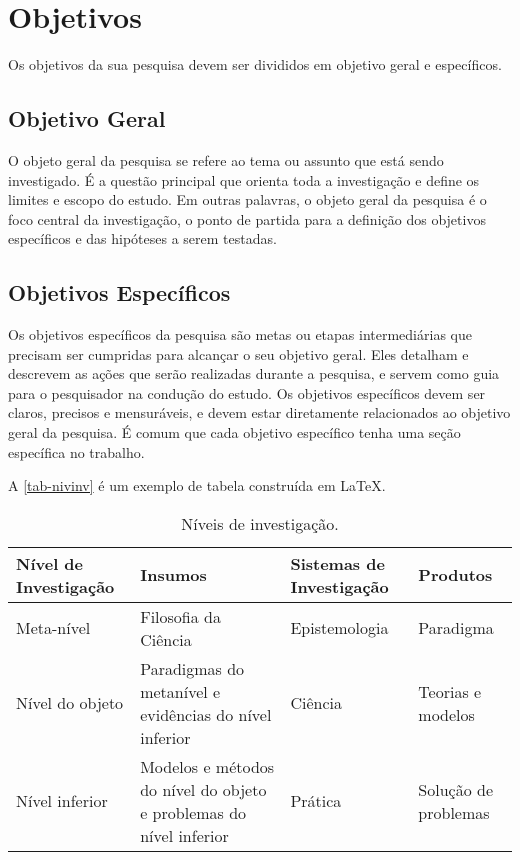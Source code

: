 \chapter{Objetivos}

Os objetivos da sua pesquisa devem ser divididos em objetivo geral e específicos.


\section{Objetivo Geral}

O objeto geral da pesquisa se refere ao tema ou assunto que está sendo investigado. É a questão principal que orienta toda a investigação e define os limites e escopo do estudo. Em outras palavras, o objeto geral da pesquisa é o foco central da investigação, o ponto de partida para a definição dos objetivos específicos e das hipóteses a serem testadas.
\section{Objetivos Específicos}

Os objetivos específicos da pesquisa são metas ou etapas intermediárias que precisam ser cumpridas para alcançar o seu objetivo geral. Eles detalham e descrevem as ações que serão realizadas durante a pesquisa, e servem como guia para o pesquisador na condução do estudo. Os objetivos específicos devem ser claros, precisos e mensuráveis, e devem estar diretamente relacionados ao objetivo geral da pesquisa. É comum que cada objetivo específico tenha uma seção específica no trabalho.

A \autoref{tab-nivinv} é um exemplo de tabela construída em
\LaTeX.

\begin{table}[htb]
\ABNTEXfontereduzida
\caption[Níveis de investigação]{Níveis de investigação.}
\label{tab-nivinv}
\begin{tabular}{p{2.6cm}|p{6.0cm}|p{2.25cm}|p{3.40cm}}
   \textbf{Nível de Investigação} & \textbf{Insumos}  & \textbf{Sistemas de Investigação}  & \textbf{Produtos}  \\
    \hline
    Meta-nível & Filosofia\index{filosofia} da Ciência  & Epistemologia &
    Paradigma  \\
    \hline
    Nível do objeto & Paradigmas do metanível e evidências do nível inferior &
    Ciência  & Teorias e modelos \\
    \hline
    Nível inferior & Modelos e métodos do nível do objeto e problemas do nível inferior & Prática & Solução de problemas  \\
\end{tabular}
\end{table}


